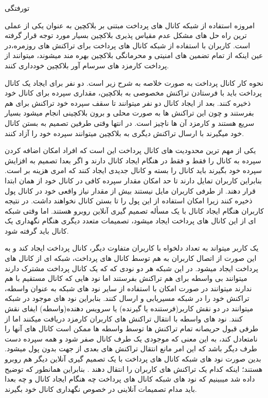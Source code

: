 


\pagestyle{empty}

‌تورفتگی

امروزه استفاده از شبکه کانال های پرداخت مبتنی بر بلاکچین به عنوان یکی از عملی ترین راه حل های مشکل عدم مقیاس پذیری بلاکچین بسیار مورد توجه قرار گرفته است.  کاربران با استفاده از شبکه کانال های پرداخت برای تراکنش های روزمره،در عین اینکه از تمام تضمین های امنیتی و محرمانگی بلاکچین بهره مند میشوند، میتوانند از پرداخت کارمزد های سرسام آور بلاکچین خودداری کنند.  


نحوه کار کانال پرداخت به صورت خلاصه به شرح زیر است. دو نفر برای ایجاد یک کانال پرداخت باید با فرستادن تراکنش مخصوصی به بلاکچین، مقداری سپرده برای کانال خود ذخیره کنند. بعد از ایجاد کانال دو نفر میتوانند تا سقف سپرده خود تراکنش برای هم بفرستند و چون این تراکنش ها به صورت محلی و برون بلاکچینی انجام میشود  بسیار سریع هستند و کارمزد آن ها ناچیز است. در انتها وقتی طرفین تصمیم به بستن کانال خود میگیرند با ارسال تراکنش دیگری به بلاکچین میتوانند سپرده خود را آزاد کنند. 

یکی از مهم ترین محدودیت های کانال پرداخت این است که افراد امکان اضافه کردن سپرده به کانال را فقط و فقط در هنگام ایجاد کانال دارند و اگر بعدا تصمیم به افزایش سپرده خود بگیرند باید کانال را بسته و کانال جدیدی ایجاد کنند که امری هزینه بر است. بنابراین  کاربران تمایل دارند تا حد امکان مقدار سپرده کافی در کانال خود از همان ابتدا قرار دهند. از طرفی کاربران مایل نیستند بیش از مقدار نیاز واقعی خود در کانال پول ذخیره کنند زیرا امکان استفاده از این پول را تا بستن کانال نخواهند داشت. در نتیجه کاربران هنگام ایجاد کانال با یک مسأله تصمیم گیری آنلاین روبرو هستند. اما وقتی شبکه ای از این کانال های پرداخت ایجاد میشود، تصمیمات متعدد دیگری هنگام نگهداری یک کانال باید گرفته شود.

یک کاربر میتواند به تعداد دلخواه با کاربران متفاوت دیگر، کانال پرداخت ایجاد کند و به این صورت از اتصال کاربران به هم توسط کانال های پرداخت، شبکه ای از کانال های پرداخت  ایجاد میشود. در این شبکه هر دو نودی که که یک کانال پرداخت مشترک دارند میتوانند بی واسطه برای هم تراکنش بفرستند اما نود هایی که کانال مستقیم با هم ندارند میتوانند در صورت امکان با استفاده از سایر نود های شبکه به عنوان واسطه، تراکنش خود را در شبکه مسیریابی و ارسال کنند. بنابراین نود های موجود در شبکه میتوانند در دو نقش کاربر(فرستنده یا گیرنده) یا سرویس دهنده(واسطه) ایفای نقش کنند. نود های واسطه با انتقال تراکنش های کاربران کارمزد دریافت میکنند اما از طرفی قبول حریصانه تمام تراکنش ها توسط واسطه ها ممکن است کانال های آنها را نامتعادل کند، به این معنی که موجودی یک طرف کانال صفر شود و همه سپرده دست طرف دیگر باشد که این امر مانع انتقال تراکنش های بعدی از جهت بدون پول میشود. بدین صورت نود های شبکه کانال های پرداخت با یک تصمیم گیری آنلاین دیگر هم روبرو هستند؛ اینکه کدام یک تراکنش های کاربران را انتقال دهند . بنابراین همانطور که توضیح داده شد میبینیم که نود های شبکه کانال های پرداخت چه هنگام ایجاد کانال و چه بعدا باید مدام تصمیمات آنلاینی در خصوص نگهداری کانال خود بگیرند.


